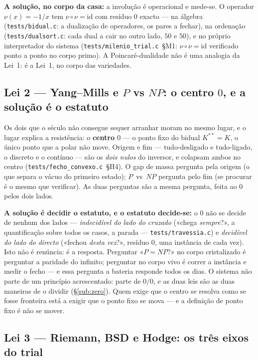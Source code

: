 \documentclass[11pt,a4paper]{article}
\newcommand{\code}[1]{\texttt{\small #1}}
\begin{document}
\textbf{A solução, no corpo da casa:} a involução é operacional e mede-se. O operador
$\nu(x)=-1/x$ tem $\nu\circ\nu=\mathrm{id}$ com resíduo $0$ exacto --- na álgebra
(\code{tests/bidual.c}: a dualização de operadores, os pares a fechar), na ordenação
(\code{tests/dualsort.c}: cada dual a cair no outro lado, $50$ e $50$), e no próprio interpretador
do sistema (\code{tests/milenio\_trial.c}~§M1: $\nu\circ\nu=\mathrm{id}$ verificado ponto a ponto no
corpo primo). A Poincaré-dualidade não é uma analogia da Lei~1: é a Lei~1, no corpo das variedades.

\subsection{Lei 2 --- Yang--Mills e $P$ vs $NP$: o centro $0$, e a solução é o estatuto}\label{sub:ym}

Os dois que o século não consegue sequer arranhar moram no mesmo lugar, e o lugar explica a
resistência: o \textbf{centro $0$} --- o ponto fixo do bidual $K^{**}=K$, o único ponto que a polar
não move. Origem e fim --- tudo-desligado e tudo-ligado, o discreto e o contínuo --- são os
\emph{dois nulos} do inversor, e colapsam ambos no centro (\code{tests/fecho\_convexo.c}~§H4). O gap
de massa pergunta pela origem (o que separa o vácuo do primeiro estado); $P$~vs~$NP$ pergunta pelo
fim (se procurar é o mesmo que verificar). As duas perguntas são a mesma pergunta, feita ao $0$
pelos dois lados.

\textbf{A solução é decidir o estatuto, e o estatuto decide-se:} o $0$ não se decide de nenhum dos
lados --- \emph{indecidível do lado do cruzado} («chega \emph{sempre}?», a quantificação sobre todos
os casos, a parada --- \code{tests/travessia.c}) e \emph{decidível do lado do directo} («fechou
\emph{desta vez}?», resíduo $0$, uma instância de cada vez). Isto não é renúncia: é a resposta.
Perguntar «$P=NP$?» no corpo cristalizado é perguntar a paridade do infinito; perguntar no corpo
vivo é correr a instância e medir o fecho --- e essa pergunta a bateria responde todos os dias.
O sistema não parte de um princípio acrescentado: parte de $0/0$, e as duas leis são as duas
maneiras de o dividir (\S\ref{sub:zero}). Quem exige que o centro se resolva como se fosse fronteira
está a exigir que o ponto fixo se mova --- e a definição de ponto fixo é não se mover.

\subsection{Lei 3 --- Riemann, BSD e Hodge: os três eixos do trial}\label{sub:trial}
\end{document}
